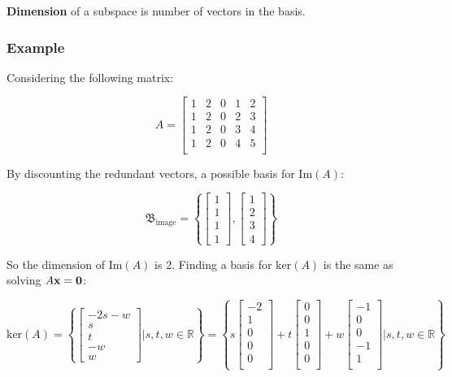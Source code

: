 \textbf{Dimension} of a subspace is number of vectors in the basis.

\subsubsection{Example}

Considering the following matrix:

\[A=\begin{bmatrix}
    1&2&0&1&2\\
    1&2&0&2&3\\
    1&2&0&3&4\\
    1&2&0&4&5\\
    \end{bmatrix}\]

By discounting the redundant vectors, a possible basis for $\mathrm{Im}(A)$:

\[\mathfrak{B}_\mathrm{image}=\left \{\begin{bmatrix} 1\\1\\1\\1 \end{bmatrix},\begin{bmatrix}1\\2\\3\\4 \end{bmatrix} \right\}\]

So the dimension of $\mathrm{Im}(A)$ is 2.
Finding a basis for $\mathrm{ker}(A)$ is the same as solving $A\textbf{x}=\textbf{0}$:

\[\mbox{ker}(A)=\left\{\begin{bmatrix}-2s-w\\ s\\t\\-w\\w \end{bmatrix} \Bigg| s,t,w\in\mathbb{R} \right\}=
\left\{s\begin{bmatrix}-2\\1\\0\\0\\0\\\end{bmatrix}+t\begin{bmatrix}0\\0\\1\\0\\0\\\end{bmatrix}+w\begin{bmatrix}-1\\0\\0\\-1\\1\\\end{bmatrix}\Bigg|s,t,w\in\mathbb{R}\right\}\]


